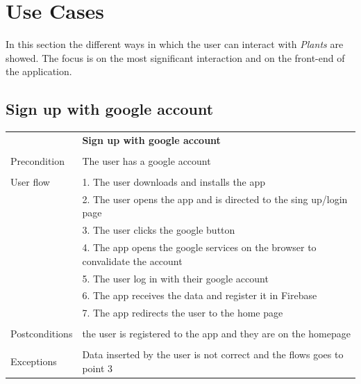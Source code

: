 \documentclass[10pt]{article}
\begin{document}
	\newpage
	\section{Use Cases}
	In this section the different ways in which the user can interact with \textit{Plants} are showed. The focus is on the most significant interaction and on the front-end of the application.
    
    \subsection{Sign up with google account}
    \begin{tabular}{ p{3cm}|p{8cm} }
     &\textbf{Sign up with google account} \\
     \\
     Precondition & The user has a google account \\
     \\
     User flow 
     & 1. The user downloads and installs the app\\ 
     & 2. The user opens the app and is directed to the sing up/login page \\
     & 3. The user clicks the google button\\ 
     & 4. The app opens the google services on the browser to convalidate the account  \\
     & 5. The user log in with their google account\\
     & 6. The app receives the data and register it in Firebase\\
     & 7. The app redirects the user to the home page\\
     \\
     Postconditions & the user is registered to the app and they are on the homepage \\ 
     \\
     Exceptions & Data inserted by the user is not correct and the flows goes to point 3\\
    \end{tabular}
    \newline
    \newline
    \newline
\end{document}

